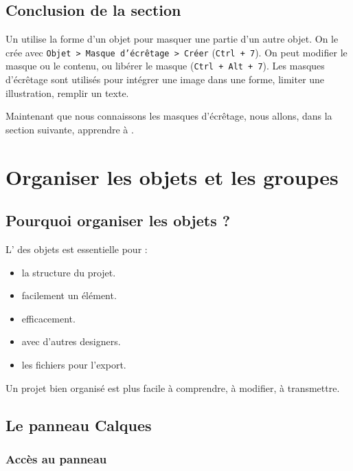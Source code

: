 \subsection*{Conclusion de la section}

Un  utilise la forme d'un objet pour masquer une partie d'un autre objet. On le crée avec \texttt{Objet > Masque d'écrêtage > Créer} (\texttt{Ctrl + 7}). On peut modifier le masque ou le contenu, ou libérer le masque (\texttt{Ctrl + Alt + 7}). Les masques d'écrêtage sont utilisés pour intégrer une image dans une forme, limiter une illustration, remplir un texte.

Maintenant que nous connaissons les masques d'écrêtage, nous allons, dans la section suivante, apprendre à .

\section{Organiser les objets et les groupes}

\subsection{Pourquoi organiser les objets ?}

L' des objets est essentielle pour :

\begin{itemize}
    \item {} la structure du projet.
    \item {} facilement un élément.
    \item {} efficacement.
    \item {} avec d'autres designers.
    \item {} les fichiers pour l'export.
\end{itemize}

Un projet bien organisé est plus facile à comprendre, à modifier, à transmettre.

\subsection{Le panneau Calques}

\subsubsection{Accès au panneau}

